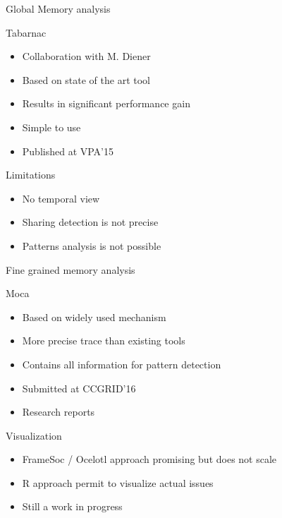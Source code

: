 \documentclass[xcolor={usenames,dvipsnames},hyperref={pdfusetitle}]{beamer}
\begin{document}
\begin{frame}{Global Memory analysis}
    \begin{block}{Tabarnac}
        \begin{itemize}
            \item Collaboration with M. Diener
            \item Based on state of the art tool
            \item Results in significant performance gain
            \item Simple to use
            \item Published at VPA'15~\cite{Beniamine15TABARNAC}
        \end{itemize}
    \end{block}
    \pause
    \begin{alertblock}{Limitations}
        \begin{itemize}
            \item No temporal view
            \item Sharing detection is not precise
            \item Patterns analysis is not possible
        \end{itemize}
    \end{alertblock}
\end{frame}

\begin{frame}{Fine grained memory analysis}
    \begin{alertblock}{Moca}
        \begin{itemize}
            \item Based on widely used mechanism
            \item More precise trace than existing tools
            \item Contains all information for pattern detection
            \item Submitted at CCGRID'16
            \item Research reports~\cite{Beniamine16Moca,Beniamine15Memory}
        \end{itemize}
    \end{alertblock}
    \pause
    \begin{block}{Visualization}
        \begin{itemize}
            \item FrameSoc / Ocelotl approach promising but does not scale
            \item R approach permit to visualize actual issues
            \item Still a work in progress
        \end{itemize}
    \end{block}
\end{frame}
\end{document}
